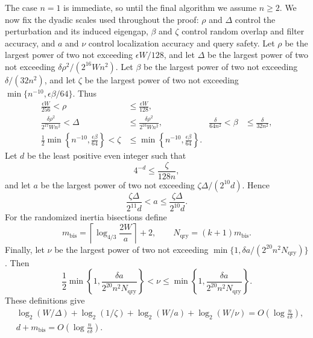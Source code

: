 \documentclass[11pt]{article}
\begin{document}
The case $n=1$ is immediate, so until the final algorithm we assume $n\geq2$.
We now fix the dyadic scales used throughout the proof: $\rho$ and $\Delta$
control the perturbation and its induced eigengap, $\beta$ and $\zeta$
control random overlap and filter accuracy, and $a$ and $\nu$ control
localization accuracy and query safety.
Let $\rho$ be the largest power of two not exceeding $\epsilon W/128$, and
let $\Delta$ be the largest power of two not exceeding
$\delta\rho^2/(2^{16}Wn^2)$.  Let $\beta$ be the largest power of two not
exceeding $\delta/(32n^2)$, and let $\zeta$ be the largest power of two not
exceeding $\min\{n^{-10},\epsilon\beta/64\}$.  Thus
\begin{align}
 \label{eq:rho-range}
 \frac{\epsilon W}{256}<\rho&\leq\frac{\epsilon W}{128},\\
 \label{eq:gap-parameters}
 \frac{\delta\rho^2}{2^{17}Wn^2}<\Delta
  &\leq\frac{\delta\rho^2}{2^{16}Wn^2},
 &
 \frac{\delta}{64n^2}<\beta&\leq\frac{\delta}{32n^2},\\
 \label{eq:zeta-range}
 \frac12\min\left\{n^{-10},\frac{\epsilon\beta}{64}\right\}
  <\zeta&\leq
 \min\left\{n^{-10},\frac{\epsilon\beta}{64}\right\}.
\end{align}
Let $d$ be the least positive even integer such that
\begin{equation}
 \label{eq:filter-degree}
 4^{-d}\leq\frac{\zeta}{128n},
\end{equation}
and let $a$ be the largest power of two not exceeding
$\zeta\Delta/(2^{10}d)$.  Hence
\begin{equation}
 \label{eq:eigenvalue-accuracy}
 \frac{\zeta\Delta}{2^{11}d}<a
  \leq\frac{\zeta\Delta}{2^{10}d}.
\end{equation}
For the randomized inertia bisections define
\begin{equation}
 \label{eq:bisection-parameters}
 m_{\mathrm{bis}}=
  \left\lceil\log_{4/3}\frac{2W}{a}\right\rceil+2,
 \qquad
 N_{\mathrm{qry}}=(k+1)m_{\mathrm{bis}}.
\end{equation}
Finally, let $\nu$ be the largest power of two not exceeding
$\min\{1,\delta a/(2^{20}n^2N_{\mathrm{qry}})\}$.  Then
\begin{equation}
 \label{eq:query-safety}
 \frac12\min\left\{1,\frac{\delta a}{2^{20}n^2N_{\mathrm{qry}}}\right\}
 <\nu\leq
 \min\left\{1,\frac{\delta a}{2^{20}n^2N_{\mathrm{qry}}}\right\}.
\end{equation}
These definitions give
\begin{align}
 \label{eq:parameter-bits}
 &\log_2(W/\Delta)+\log_2(1/\zeta)+\log_2(W/a)
   +\log_2(W/\nu)
   =O\!\left(\log\frac{n}{\epsilon\delta}\right),\\
 &d+m_{\mathrm{bis}}
   =O\!\left(\log\frac{n}{\epsilon\delta}\right).
\end{align}
\end{document}
